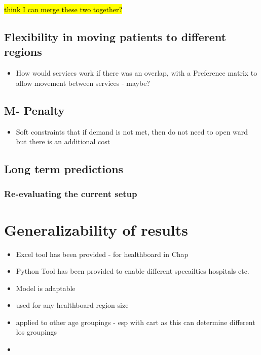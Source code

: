 \documentclass[../thesis.tex]{subfiles}
\begin{document}
\hl{think I can merge these two together?}
\subsection{Flexibility in moving patients to different regions}
\begin{itemize}
    \item How would services work if there was an overlap, with a Preference matrix to allow movement between services - maybe? 
\end{itemize}
\subsection{M- Penalty}
\begin{itemize}
    \item Soft constraints that if demand is not met, then do not need to open ward but there is an additional cost
\end{itemize}
\subsection{Long term predictions}
\subsubsection{Re-evaluating the current setup}




\section{Generalizability of results}
\begin{itemize}
\item Excel tool has been provided - for healthboard in Chap
\item Python Tool has been provided to enable different specailties  hospitals etc.
    \item Model is adaptable
    \item used for any healthboard region size
    \item applied to other age groupings - esp with cart as this can determine different los groupings
    \item 
\end{itemize}
\end{document}
